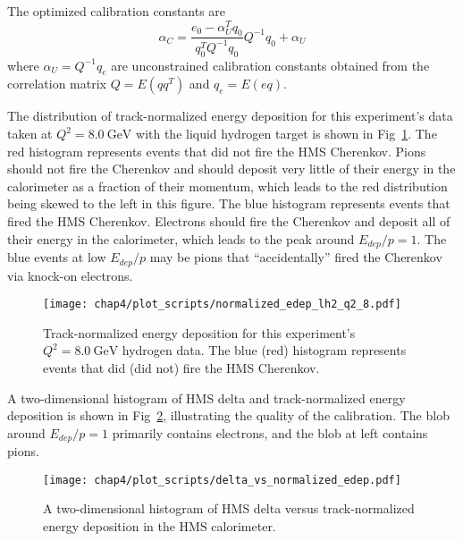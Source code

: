 The optimized calibration constants are
\begin{equation}
    \alpha_C = \frac{e_0 - \alpha_U^T q_0}{q_0^T Q^{-1} q_0} Q^{-1} q_0 + \alpha_U
\end{equation}
where $\alpha_U = Q^{-1}q_e$ are unconstrained calibration constants obtained
from the correlation matrix $Q=E(qq^T)$ and $q_e=E(eq)$.

The distribution of track-normalized energy deposition for this experiment's
data taken at $Q^2=\SI{8.0}{\giga\electronvolt}$ with the liquid hydrogen
target is shown in Fig~\ref{fig:normalized_edep}.
The red histogram represents events that did not fire the HMS Cherenkov.
Pions should not fire the Cherenkov and should deposit very little of their
energy in the calorimeter as a fraction of their momentum, which leads to the
red distribution being skewed to the left in this figure.
The blue histogram represents events that fired the HMS Cherenkov.
Electrons should fire the Cherenkov and deposit all of their energy in the
calorimeter, which leads to the peak around $E_{dep}/p=1$.
The blue events at low $E_{dep}/p$ may be pions that ``accidentally'' fired the
Cherenkov via knock-on electrons.

\begin{figure}[!h]
    \centering
    \texttt{[image: chap4/plot\_scripts/normalized\_edep\_lh2\_q2\_8.pdf]}
    \caption[Track-normalized energy deposition for this experiment's
            $Q^2=\SI{8.0}{\giga\electronvolt}$ hydrogen data.]{
            Track-normalized energy deposition for this experiment's
            $Q^2=\SI{8.0}{\giga\electronvolt}$ hydrogen data.
            The blue (red) histogram represents events that did (did not) fire the HMS Cherenkov.
            }
    \label{fig:normalized_edep}
\end{figure}

A two-dimensional histogram of HMS delta and track-normalized energy deposition
is shown in Fig~\ref{fig:delta_vs_edep}, illustrating the quality of the
calibration.
The blob around $E_{dep}/p=1$ primarily contains electrons, and the blob at
left contains pions.

\begin{figure}[!h]
    \centering
    \texttt{[image: chap4/plot\_scripts/delta\_vs\_normalized\_edep.pdf]}
    \caption{
            A two-dimensional histogram of HMS delta versus track-normalized
            energy deposition in the HMS calorimeter.
            }
    \label{fig:delta_vs_edep}
\end{figure}

